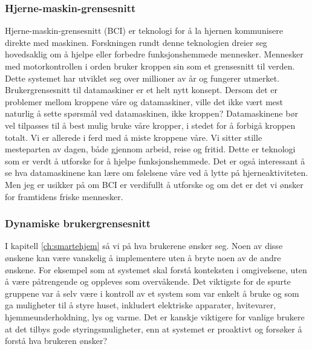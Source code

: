 \subsubsection*{Hjerne-maskin-grensesnitt}
Hjerne-maskin-grensesnitt (BCI) er teknologi for å la hjernen kommunisere direkte med maskinen. Forskningen rundt denne teknologien dreier seg hovedsaklig om å hjelpe eller forbedre funksjonshemmede mennesker. Mennesker med motorkontrollen i orden bruker kroppen sin som et grensesnitt til verden. Dette systemet har utviklet seg over millioner av år og fungerer utmerket. Brukergrensesnitt til datamaskiner er et helt nytt konsept. Dersom det er problemer mellom kroppene våre og datamaskiner, ville det ikke vært mest naturlig å sette spørsmål ved datamaskinen, ikke kroppen? Datamaskinene bør vel tilpasses til å best mulig bruke våre kropper, i stedet for å forbigå kroppen totalt. Vi er allerede i ferd med å miste kroppene våre. Vi sitter stille mesteparten av dagen, både gjennom arbeid, reise og fritid. Dette er teknologi som er verdt å utforske for å hjelpe funksjonshemmede. Det er også interessant å se hva datamaskinene kan lære om følelsene våre ved å lytte på hjerneaktiviteten. Men jeg er usikker på om BCI er verdifullt å utforske og om det er det vi ønsker for framtidens friske mennesker.\\

\subsubsection*{Dynamiske brukergrensesnitt}
I kapitell \ref{ch:smartehjem} så vi på hva brukerene ønsker seg. Noen av disse ønskene kan være vanskelig å implementere uten å bryte noen av de andre ønskene. For eksempel som at systemet skal forstå konteksten i omgivelsene, uten å være påtrengende og oppleves som overvåkende. Det viktigste for de spurte gruppene var å selv være i kontroll av et system som var enkelt å bruke og som ga muligheter til å styre huset, inkludert elektriske apparater, hvitevarer, hjemmeunderholdning, lys og varme. Det er kanskje viktigere for vanlige brukere at det tilbys gode styringsmuligheter, enn at systemet er proaktivt og forsøker å forstå hva brukeren ønsker?

